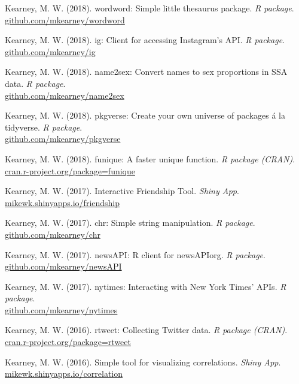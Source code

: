 \begin{bibenum}
  \item Kearney, M. W. (2018).
    wordword: Simple little thesaurus package.
    \textit{R package}.
    \href{https://github.com/mkearney/wordword}{github.com/mkearney/wordword}

  \item Kearney, M. W. (2018).
    ig: Client for accessing Instagram's API.
    \textit{R package}.
    \href{https://github.com/mkearney/ig}{github.com/mkearney/ig}

  \item Kearney, M. W. (2018).
    name2sex: Convert names to sex proportions in SSA data.
    \textit{R package}.
    \\ \href{https://github.com/mkearney/name2sex}{github.com/mkearney/name2sex}

  \item Kearney, M. W. (2018).
    pkgverse: Create your own universe of packages \'{a} la tidyverse.
    \textit{R package}.
    \\ \href{https://github.com/mkearney/pkgverse}{github.com/mkearney/pkgverse}

  \item Kearney, M. W. (2018).
    funique: A faster unique function.
    \textit{R package (CRAN)}.
    \\ \href{http://cran.r-project.org/package=funique}{cran.r-project.org/package=funique}

  \item Kearney, M. W. (2017).
    Interactive Friendship Tool.
    \textit{Shiny App}.
    \href{https://mikewk.shinyapps.io/friendship/}{mikewk.shinyapps.io/friendship}

  \item Kearney, M. W. (2017).
    chr: Simple string manipulation.
    \textit{R package}.
    \href{https://github.com/mkearney/chr}{github.com/mkearney/chr}

  \item Kearney, M. W. (2017).
    newsAPI: R client for newsAPIorg.
    \textit{R package}.
    \href{https://github.com/mkearney/newsAPI}{github.com/mkearney/newsAPI}

  \item Kearney, M. W. (2017).
    nytimes: Interacting with New York Times' APIs.
    \textit{R package}.
    \\ \href{https://github.com/mkearney/nytimes}{github.com/mkearney/nytimes}

  \item Kearney, M. W. (2016).
    rtweet: Collecting Twitter data.
    \textit{R package (CRAN)}.
    \\ \href{http://cran.r-project.org/package=rtweet}{cran.r-project.org/package=rtweet}

  \item Kearney, M. W. (2016).
    Simple tool for visualizing correlations.
    \textit{Shiny App}.
    \\ \href{https://mikewk.shinyapps.io/correlation/}{mikewk.shinyapps.io/correlation}

\end{bibenum}
